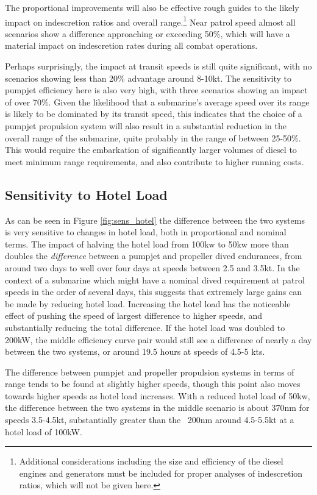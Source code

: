 \documentclass{article}\usepackage[]{graphicx}\usepackage[]{color}
\begin{document}
The proportional improvements will also be effective rough guides to the likely impact on indescretion ratios and overall range.\footnote{Additional considerations including the size and efficiency of the diesel engines and generators must be included for proper analyses of indescretion ratios, which will not be given here.}  Near patrol speed almost all scenarios show a difference approaching or exceeding 50\%, which will have a material impact on indescretion rates during all combat operations.

Perhaps surprisingly, the impact at transit speeds is still quite significant, with no scenarios showing less than 20\% advantage around 8-10kt. The sensitivity to pumpjet efficiency here is also very high, with three scenarios showing an impact of over 70\%.  Given the likelihood that a submarine's average speed over its range is likely to be dominated by its transit speed, this indicates that the choice of a pumpjet propulsion system will also result in a substantial reduction in the overall range of the submarine, quite probably in the range of between 25-50\%.  This would require the embarkation of significantly larger volumes of diesel to meet minimum range requirements, and also contribute to higher running costs.

\subsection{Sensitivity to Hotel Load}
As can be seen in Figure \ref{fig:sens_hotel} the difference between the two systems is very sensitive to changes in hotel load, both in proportional and nominal terms.  The impact of halving the hotel load from 100kw to 50kw more than doubles the \textit{difference} between a pumpjet and propeller dived endurances, from around two days to well over four days at speeds between 2.5 and 3.5kt.  In the context of a submarine which might have a nominal dived requirement at patrol speeds in the order of several days, this suggests that extremely large gains can be made by reducing hotel load.  Increasing the hotel load has the noticeable effect of pushing the speed of largest difference to higher speeds, and substantially reducing the total difference. If the hotel load was doubled to 200kW, the middle efficiency curve pair would still see a difference of nearly a day between the two systems, or around 19.5 hours at speeds of 4.5-5 kts.

The difference between pumpjet and propeller propulsion systems in terms of range tends to be found at slightly higher speeds, though this point also moves towards higher speeds as hotel load increases.  With a reduced hotel load of 50kw, the difference between the two systems in the middle scenario is about 370nm for speeds 3.5-4.5kt, substantially greater than the ~200nm around 4.5-5.5kt at a hotel load of 100kW.
\end{document}
